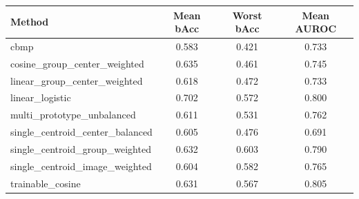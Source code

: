 \begin{tabular}{lccc}
Method & Mean bAcc & Worst bAcc & Mean AUROC \\
\hline
cbmp & 0.583 & 0.421 & 0.733 \\
cosine\_group\_center\_weighted & 0.635 & 0.461 & 0.745 \\
linear\_group\_center\_weighted & 0.618 & 0.472 & 0.733 \\
linear\_logistic & 0.702 & 0.572 & 0.800 \\
multi\_prototype\_unbalanced & 0.611 & 0.531 & 0.762 \\
single\_centroid\_center\_balanced & 0.605 & 0.476 & 0.691 \\
single\_centroid\_group\_weighted & 0.632 & 0.603 & 0.790 \\
single\_centroid\_image\_weighted & 0.604 & 0.582 & 0.765 \\
trainable\_cosine & 0.631 & 0.567 & 0.805 \\
\end{tabular}
